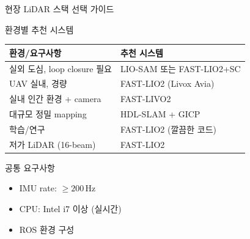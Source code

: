 
\begin{frame}{현장 LiDAR 스택 선택 가이드}
  \begin{block}{환경별 추천 시스템}
    \begin{center}
      \begin{tabular}{ll}
        \hline
        \textbf{환경/요구사항} & \textbf{추천 시스템} \\
        \hline
        실외 도심, loop closure 필요 & LIO-SAM 또는 FAST-LIO2+SC \\
        UAV 실내, 경량 & FAST-LIO2 (Livox Avia) \\
        실내 인간 환경 + camera & FAST-LIVO2 \\
        대규모 정밀 mapping & HDL-SLAM + GICP \\
        학습/연구 & FAST-LIO2 (깔끔한 코드) \\
        저가 LiDAR (16-beam) & FAST-LIO2 \\
        \hline
      \end{tabular}
    \end{center}
  \end{block}
  \pause
  \begin{exampleblock}{공통 요구사항}
    \begin{itemize}
      \item IMU rate: $\geq 200\,$Hz
      \item CPU: Intel i7 이상 (실시간)
      \item ROS 환경 구성
    \end{itemize}
  \end{exampleblock}
\end{frame}

